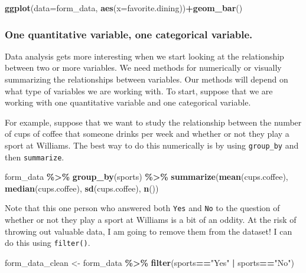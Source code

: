 \documentclass[
]{article}
\newenvironment{Shaded}{\begin{snugshade}}{\end{snugshade}}
\newcommand{\AttributeTok}[1]{\textcolor[rgb]{0.13,0.29,0.53}{#1}}
\newcommand{\FunctionTok}[1]{\textcolor[rgb]{0.13,0.29,0.53}{\textbf{#1}}}
\newcommand{\NormalTok}[1]{#1}
\newcommand{\OtherTok}[1]{\textcolor[rgb]{0.56,0.35,0.01}{#1}}
\newcommand{\SpecialCharTok}[1]{\textcolor[rgb]{0.81,0.36,0.00}{\textbf{#1}}}
\newcommand{\StringTok}[1]{\textcolor[rgb]{0.31,0.60,0.02}{#1}}
\begin{document}
\begin{Shaded}
\begin{Highlighting}[]
\FunctionTok{ggplot}\NormalTok{(}\AttributeTok{data=}\NormalTok{form\_data, }\FunctionTok{aes}\NormalTok{(}\AttributeTok{x=}\NormalTok{favorite.dining))}\SpecialCharTok{+}\FunctionTok{geom\_bar}\NormalTok{()}
\end{Highlighting}
\end{Shaded}

\subsubsection{One quantitative variable, one categorical
variable.}\label{one-quantitative-variable-one-categorical-variable.}

Data analysis gets more interesting when we start looking at the
relationship between two or more variables. We need methods for
numerically or visually summarizing the relationships between variables.
Our methods will depend on what type of variables we are working with.
To start, suppose that we are working with one quantitative variable and
one categorical variable.

For example, suppose that we want to study the relationship between the
number of cups of coffee that someone drinks per week and whether or not
they play a sport at Williams. The best way to do this numerically is by
using \texttt{group\_by} and then \texttt{summarize}.

\begin{Shaded}
\begin{Highlighting}[]
\NormalTok{form\_data }\SpecialCharTok{\%\textgreater{}\%} \FunctionTok{group\_by}\NormalTok{(sports) }\SpecialCharTok{\%\textgreater{}\%} \FunctionTok{summarize}\NormalTok{(}\FunctionTok{mean}\NormalTok{(cups.coffee), }\FunctionTok{median}\NormalTok{(cups.coffee), }\FunctionTok{sd}\NormalTok{(cups.coffee), }\FunctionTok{n}\NormalTok{())}
\end{Highlighting}
\end{Shaded}

Note that this one person who answered both \texttt{Yes} and \texttt{No}
to the question of whether or not they play a sport at Williams is a bit
of an oddity. At the risk of throwing out valuable data, I am going to
remove them from the dataset! I can do this using \texttt{filter()}.

\begin{Shaded}
\begin{Highlighting}[]
\NormalTok{form\_data\_clean }\OtherTok{\textless{}{-}}\NormalTok{ form\_data }\SpecialCharTok{\%\textgreater{}\%} \FunctionTok{filter}\NormalTok{(sports}\SpecialCharTok{==}\StringTok{"Yes"} \SpecialCharTok{|}\NormalTok{ sports}\SpecialCharTok{==}\StringTok{"No"}\NormalTok{)}
\end{Highlighting}
\end{Shaded}
\end{document}
